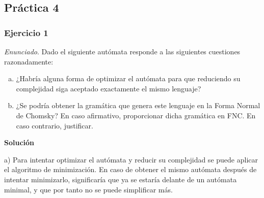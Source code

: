 \documentclass[11pt,a4paper]{article}
\newcommand{\enu}{\textit{Enunciado}}
\newcommand{\sol}{\textbf{Solución}}
\begin{document}
	\newpage
	\subsection{Práctica 4}
	
		\subsubsection{Ejercicio 1}
		\enu. Dado el siguiente autómata responde a las siguientes cuestiones razonadamente:
		
		\begin{enumerate}[a)]
			\item ¿Habría alguna forma de optimizar el autómata para que reduciendo su complejidad siga aceptado exactamente
			el mismo lenguaje?
			\item ¿Se podría obtener la gramática que genera este lenguaje en la Forma Normal de Chomsky? En caso afirmativo,
			proporcionar dicha gramática en FNC. En caso contrario, justificar.
		\end{enumerate}
		
		\begin{center}
		\end{center}
		
		\sol \par
		
		a) Para intentar optimizar el autómata y reducir su complejidad se puede aplicar el algoritmo de minimización. En
		caso de obtener el mismo autómata después de intentar minimizarlo, significaría que ya se estaría delante de un
		autómata minimal, y que por tanto no se puede simplificar más. \par
		
\end{document}
